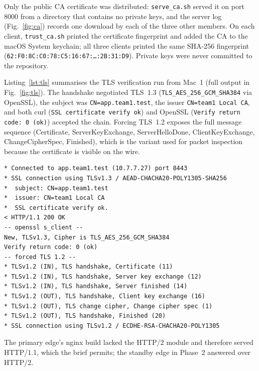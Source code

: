 \documentclass[conference,a4paper]{IEEEtran}
\newcommand{\code}[1]{\texttt{#1}}
\begin{document}
Only the public CA certificate was distributed: \code{serve\_ca.sh} served it on port 8000 from a
directory that contains no private keys, and the server log (Fig.~\ref{fig:ca}) records one
download by each of the three other members. On each client, \code{trust\_ca.sh} printed the
certificate fingerprint and added the CA to the macOS System keychain; all three clients printed
the same SHA-256 fingerprint (\code{62:F0:8C:C0:78:C5:16:67:\ldots:2B:31:D9}). Private keys were
never committed to the repository.

Listing~\ref{lst:tls} summarises the TLS verification run from Mac~1 (full output in
Fig.~\ref{fig:tls}). The handshake negotiated
TLS~1.3 (\code{TLS\_AES\_256\_GCM\_SHA384} via OpenSSL), the subject was
\code{CN=app.team1.test}, the issuer \code{CN=team1 Local CA}, and both curl
(\code{SSL certificate verify ok}) and OpenSSL (\code{Verify return code: 0 (ok)}) accepted the
chain. Forcing TLS~1.2 exposes the full message sequence (Certificate, ServerKeyExchange,
ServerHelloDone, ClientKeyExchange, ChangeCipherSpec, Finished), which is the variant used for
packet inspection because the certificate is visible on the wire.
\begin{lstlisting}[float=tb,caption={TLS verification from Mac 1 (demo\_tls.sh, excerpt)},label={lst:tls}]
* Connected to app.team1.test (10.7.7.27) port 8443
* SSL connection using TLSv1.3 / AEAD-CHACHA20-POLY1305-SHA256
*  subject: CN=app.team1.test
*  issuer: CN=team1 Local CA
*  SSL certificate verify ok.
< HTTP/1.1 200 OK
-- openssl s_client --
New, TLSv1.3, Cipher is TLS_AES_256_GCM_SHA384
Verify return code: 0 (ok)
-- forced TLS 1.2 --
* TLSv1.2 (IN), TLS handshake, Certificate (11)
* TLSv1.2 (IN), TLS handshake, Server key exchange (12)
* TLSv1.2 (IN), TLS handshake, Server finished (14)
* TLSv1.2 (OUT), TLS handshake, Client key exchange (16)
* TLSv1.2 (OUT), TLS change cipher, Change cipher spec (1)
* TLSv1.2 (OUT), TLS handshake, Finished (20)
* SSL connection using TLSv1.2 / ECDHE-RSA-CHACHA20-POLY1305
\end{lstlisting}

The primary edge's nginx build lacked the HTTP/2 module and therefore served HTTP/1.1, which the
brief permits; the standby edge in Phase~2 answered over HTTP/2.
\end{document}
